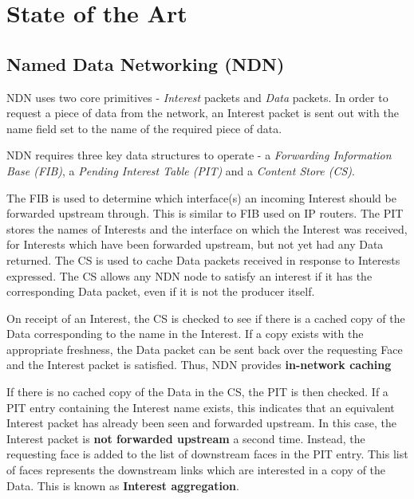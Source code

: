 \section{State of the Art}
\subsection{Named Data Networking (NDN)}\label{sec:ndn-sota}
NDN uses two core primitives - \textit{Interest} packets and \textit{Data} packets. In order to request a piece of data from the network, an Interest packet is sent out with the name field set to the name of the required piece of data.

NDN requires three key data structures to operate - a \textit{Forwarding Information Base (FIB)}, a \textit{Pending Interest Table (PIT)} and a \textit{Content Store (CS)}. 

The FIB is used to determine which interface(s) an incoming Interest should be forwarded upstream through. This is similar to FIB used on IP routers. The PIT stores the names of Interests and the interface on which the Interest was received, for Interests which have been forwarded upstream, but not yet had any Data returned. The CS is used to cache Data packets received in response to Interests expressed. The CS allows any NDN node to satisfy an interest if it has the corresponding Data packet, even if it is not the producer itself.




On receipt of an Interest, the CS is checked to see if there is a cached copy of the Data corresponding to the name in the Interest. If a copy exists with the appropriate freshness, the Data packet can be sent back over the requesting Face and the Interest packet is satisfied. Thus, NDN provides \textbf{in-network caching}

If there is no cached copy of the Data in the CS, the PIT is then checked. If a PIT entry containing the Interest name exists, this indicates that an equivalent Interest packet has already been seen and forwarded upstream. In this case, the Interest packet is \textbf{not forwarded upstream} a second time. Instead, the requesting face is added to the list of downstream faces in the PIT entry. This list of faces represents the downstream links which are interested in a copy of the Data. This is known as \textbf{Interest aggregation}.

